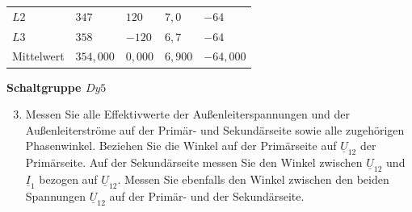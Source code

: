 \begin{enumerate}[label=\alph*)]
\begin{table}[h!]
\begin{tabular}{lllll}
            $L2$       & $347$                    & $120$                       & $7,0$                    & $-64$                       \\
            $L3$       & $358$                    & $-120$                      & $6,7$                    & $-64$                       \\ \hline
            Mittelwert & $354,000$                & $0,000$                     & $6,900$                  & $-64,000$                   \\ \hline\hline
          \end{tabular}
        \end{table}
        \pagebreak
\end{enumerate}
\textbf{Schaltgruppe $Dy5$}
\begin{enumerate}[label=\alph*)]
  \setcounter{enumi}{2}
  \item Messen Sie alle Effektivwerte der Außenleiterspannungen und der
        Außenleiterströme auf der Primär- und Sekundärseite sowie alle zugehörigen
        Phasenwinkel. Beziehen Sie die Winkel auf der Primärseite auf $\underline
          U_{12}$ der Primärseite. Auf der Sekundärseite messen Sie den Winkel zwischen
        $\underline U_{12}$ und $\underline I_1$ bezogen auf $\underline U_{12}$.
        Messen Sie ebenfalls den Winkel zwischen den beiden Spannungen $\underline
          U_{12}$ auf der Primär- und der Sekundärseite.


\end{enumerate}
